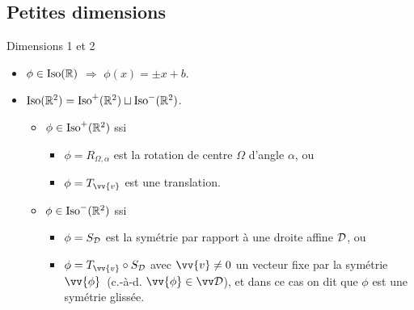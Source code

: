 \documentclass{m53beamer}
\begin{document}
\subsection{Petites dimensions}
\begin{frame}{Dimensions 1 et 2}
  \begin{itemize}[<+(1)->]
    \item $\phi \in \operatorname{Iso}(\mathbb{R})$ $\Rightarrow$ $\phi(x) = \pm x +b$.\pause\\
    \item $\operatorname{Iso}(\mathbb{R}^{2}) = \operatorname{Iso}^{+}(\mathbb{R}^{2}) \sqcup \operatorname{Iso}^{-}(\mathbb{R}^{2})$.
      \begin{itemize}[<+(1)->]
        \item $\phi\in\operatorname{Iso}^{+}(\mathbb{R}^{2})$ ssi\pause
          \begin{itemize}[<.(1)->]
            \item $\phi = R_{\Omega,\alpha}$ est la rotation de centre $\Omega$ d'angle $\alpha$\pause, ou
            \item $\phi = T_{\vv{v}}$ est une translation.
          \end{itemize}
        \item $\phi\in\operatorname{Iso}^{-}(\mathbb{R}^{2})$ ssi\pause
          \begin{itemize}[<.(1)->]
            \item $\phi = S_{\mathcal{D}}$ est la symétrie par rapport à une droite affine $\mathcal{D}$\pause, ou
            \item $\phi = T_{\vv{v}}\circ S_{\ens{D}}$ avec $\vv{v}\neq0$ un vecteur fixe par la symétrie $\vv{\phi}$\pause\ (c.-à-d. $\vv{\phi} \in \ev{D}$)\pause, et dans ce cas on dit que $\phi$ est une \alert{symétrie glissée}.
          \end{itemize}
      \end{itemize}\pause
  \end{itemize}
\end{frame}
\end{document}
